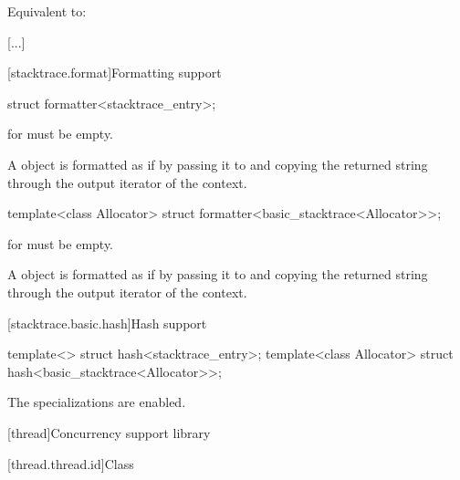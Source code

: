 \documentclass{wg21}
\begin{document}
\begin{itemdescr}
    \pnum
    \effects
    Equivalent to: 
\end{itemdescr}

\textcolor{noteclr}{[...]}

\begin{addedblock}

[stacktrace.format]{Formatting support}

\begin{itemdecl}
struct formatter<stacktrace_entry>;
\end{itemdecl}

\begin{itemdescr}
 for  must be empty.

A  object is formatted as if by passing it to  and copying the returned string through the output iterator of the context.
\end{itemdescr}



\begin{itemdecl}
template<class Allocator>
struct formatter<basic_stacktrace<Allocator>>;
\end{itemdecl}

\begin{itemdescr}
 for  must be empty.

A  object is formatted as if by passing it to  and copying the returned string through the output iterator of the context.
\end{itemdescr}

\end{addedblock}


[stacktrace.basic.hash]{Hash support}

\begin{itemdecl}
    template<> struct hash<stacktrace_entry>;
    template<class Allocator> struct hash<basic_stacktrace<Allocator>>;
\end{itemdecl}

\begin{itemdescr}
    \pnum
    The specializations are enabled.
\end{itemdescr}

[thread]{Concurrency support library}

[thread.thread.id]{Class }
\end{document}

